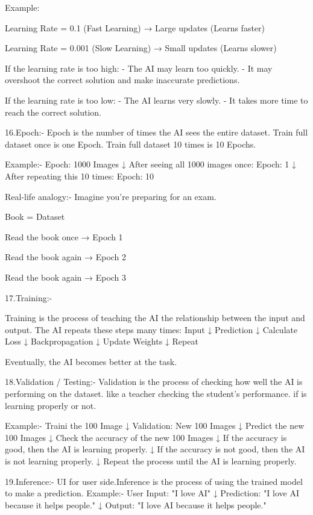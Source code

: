 Example:
 
 Learning Rate = 0.1 (Fast Learning)
 → Large updates (Learns faster)
 
 Learning Rate = 0.001 (Slow Learning)
 → Small updates (Learns slower)
 
 If the learning rate is too high:
 - The AI may learn too quickly.
 - It may overshoot the correct solution and make inaccurate predictions.
 
 If the learning rate is too low:
 - The AI learns very slowly.
 - It takes more time to reach the correct solution.





16.Epoch:-
Epoch is the number of times the AI sees the entire dataset.
Train full dataset once is one Epoch. Train full dataset 10 times is 10 Epochs.

Example:-
Epoch: 1000 Images
   ↓
After seeing all 1000 images once: Epoch: 1
   ↓
After repeating this 10 times: Epoch: 10

Real-life analogy:-
Imagine you're preparing for an exam.

Book = Dataset

Read the book once  → Epoch 1

Read the book again → Epoch 2

Read the book again → Epoch 3




17.Training:-

Training is the process of teaching the AI the relationship between the input and output.
The AI repeats these steps many times:
Input
↓
Prediction
↓
Calculate Loss
↓
Backpropagation
↓
Update Weights
↓
Repeat

Eventually, the AI becomes better at the task.




18.Validation / Testing:-
Validation is the process of checking how well the AI is performing on the dataset.
like a teacher checking the student's performance. if is learning properly or not.

Example:-
Traini the 100 Image
   ↓
Validation: New 100 Images 
   ↓
Predict the new 100 Images
   ↓
Check the accuracy of the new 100 Images
   ↓
If the accuracy is good, then the AI is learning properly.
   ↓
If the accuracy is not good, then the AI is not learning properly.
   ↓
Repeat the process until the AI is learning properly.



19.Inference:-
 UI for user side.Inference is the process of using the trained model to make a prediction.
 Example:-
 User Input: "I love AI"
   ↓
 Prediction: "I love AI because it helps people."
   ↓
 Output: "I love AI because it helps people."



